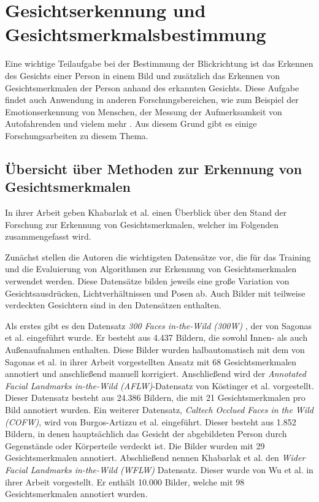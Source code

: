\section{Gesichtserkennung und Gesichtsmerkmalsbestimmung}\label{sec:related:face}

Eine wichtige Teilaufgabe bei der Bestimmung der Blickrichtung ist das Erkennen des Gesichts einer Person in einem Bild und zusätzlich das Erkennen von Gesichtsmerkmalen der Person anhand des erkannten Gesichts. Diese Aufgabe findet auch Anwendung in anderen Forschungsbereichen, wie zum Beispiel der Emotionserkennung von Menschen, der Messung der Aufmerksamkeit von Autofahrenden und vielem mehr \cite{paper:face:survey}. Aus diesem Grund gibt es einige Forschungsarbeiten zu diesem Thema. 

\subsection{Übersicht über Methoden zur Erkennung von Gesichtsmerkmalen}\label{sec:related:face:survey}
In ihrer Arbeit \cite{paper:face:survey} geben Khabarlak et al. einen Überblick über den Stand der Forschung zur Erkennung von Gesichtsmerkmalen, welcher im Folgenden zusammengefasst wird.

Zunächst stellen die Autoren die wichtigsten Datensätze vor, die für das Training und die Evaluierung von Algorithmen zur Erkennung von Gesichtsmerkmalen verwendet werden. Diese Datensätze bilden jeweils eine große Variation von Gesichtsausdrücken, Lichtverhältnissen und Posen ab. Auch Bilder mit teilweise verdeckten Gesichtern sind in den Datensätzen enthalten. 

Als erstes gibt es den Datensatz \textit{300 Faces in-the-Wild (300W)} \cite{paper:300w}, der von Sagonas et al. eingeführt wurde. Er besteht aus 4.437 Bildern, die sowohl Innen- als auch Außenaufnahmen enthalten. Diese Bilder wurden halbautomatisch mit dem von Sagonas et al. in ihrer Arbeit \cite{paper:300w:ground:truth} vorgestellten Ansatz mit 68 Gesichtsmerkmalen annotiert und anschließend manuell korrigiert. Anschließend wird der \textit{Annotated Facial Landmarks in-the-Wild (AFLW)}-Datensatz von Köstinger et al. \cite{paper:aflw} vorgestellt.  Dieser Datensatz besteht aus 24.386 Bildern, die mit 21 Gesichtsmerkmalen pro Bild annotiert wurden. Ein weiterer Datensatz, \textit{Caltech Occlued Faces in the Wild (COFW)}, wird von Burgos-Artizzu et al. \cite{paper:cofw} eingeführt. Dieser besteht aus 1.852 Bildern, in denen hauptsächlich das Gesicht der abgebildeten Person durch Gegenstände oder Körperteile verdeckt ist. Die Bilder wurden mit 29 Gesichtsmerkmalen annotiert. Abschließend nennen Khabarlak et al. den \textit{Wider Facial Landmarks in-the-Wild (WFLW)} Datensatz. Dieser wurde von Wu et al. in ihrer Arbeit \cite{paper:wflw} vorgestellt. Er enthält 10.000 Bilder, welche mit 98 Gesichtsmerkmalen annotiert wurden.

